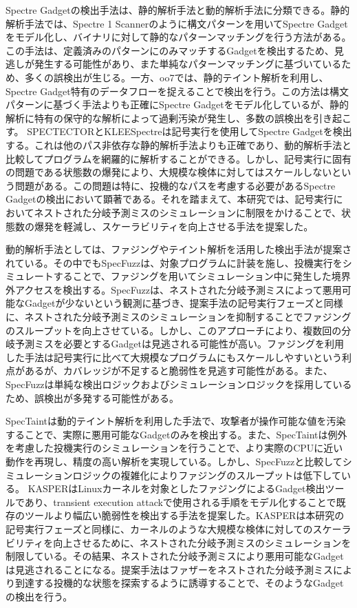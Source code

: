 Spectre Gadgetの検出手法は、静的解析手法と動的解析手法に分類できる。静的解析手法では、Spectre 1 Scanner\cite{Spectre-Scanner}のように構文パターンを用いてSpectre Gadgetをモデル化し、バイナリに対して静的なパターンマッチングを行う方法がある。この手法は、定義済みのパターンにのみマッチするGadgetを検出するため、見逃しが発生する可能性があり、また単純なパターンマッチングに基づいているため、多くの誤検出が生じる。一方、oo7\cite{wang2018oo7}では、静的テイント解析を利用し、Spectre Gadget特有のデータフローを捉えることで検出を行う。この方法は構文パターンに基づく手法よりも正確にSpectre Gadgetをモデル化しているが、静的解析に特有の保守的な解析によって過剰汚染が発生し、多数の誤検出を引き起こす。
SPECTECTOR\cite{guarnieri2020spectector}とKLEESpectre\cite{wang2020kleespectre}は記号実行を使用してSpectre Gadgetを検出する。これは他のパス非依存な静的解析手法よりも正確であり、動的解析手法と比較してプログラムを網羅的に解析することができる。しかし、記号実行に固有の問題である状態数の爆発により、大規模な検体に対してはスケールしないという問題がある。この問題は特に、投機的なパスを考慮する必要があるSpectre Gadgetの検出において顕著である。それを踏まえて、本研究では、記号実行においてネストされた分岐予測ミスのシミュレーションに制限をかけることで、状態数の爆発を軽減し、スケーラビリティを向上させる手法を提案した。\par

動的解析手法としては、ファジングやテイント解析を活用した検出手法が提案されている。その中でもSpecFuzz\cite{oleksenko2020specfuzz}は、対象プログラムに計装を施し、投機実行をシミュレートすることで、ファジングを用いてシミュレーション中に発生した境界外アクセスを検出する。SpecFuzzは、ネストされた分岐予測ミスによって悪用可能なGadgetが少ないという観測に基づき、提案手法の記号実行フェーズと同様に、ネストされた分岐予測ミスのシミュレーションを抑制することでファジングのスループットを向上させている。しかし、このアプローチにより、複数回の分岐予測ミスを必要とするGadgetは見逃される可能性が高い。ファジングを利用した手法は記号実行に比べて大規模なプログラムにもスケールしやすいという利点があるが、カバレッジが不足すると脆弱性を見逃す可能性がある。また、SpecFuzzは単純な検出ロジックおよびシミュレーションロジックを採用しているため、誤検出が多発する可能性がある。

SpecTaint\cite{qi2021spectaint}は動的テイント解析を利用した手法で、攻撃者が操作可能な値を汚染することで、実際に悪用可能なGadgetのみを検出する。また、SpecTaintは例外を考慮した投機実行のシミュレーションを行うことで、より実際のCPUに近い動作を再現し、精度の高い解析を実現している。しかし、SpecFuzzと比較してシミュレーションロジックの複雑化によりファジングのスループットは低下している。
KASPER\cite{johannesmeyer2022kasper}はLinuxカーネルを対象としたファジングによるGadget検出ツールであり、transient execution attackで使用される手順をモデル化することで既存のツールより幅広い脆弱性を検出する手法を提案した。KASPERは本研究の記号実行フェーズと同様に、カーネルのような大規模な検体に対してのスケーラビリティを向上させるために、ネストされた分岐予測ミスのシミュレーションを制限している。その結果、ネストされた分岐予測ミスにより悪用可能なGadgetは見逃されることになる。提案手法はファザーをネストされた分岐予測ミスにより到達する投機的な状態を探索するように誘導することで、そのようなGadgetの検出を行う。\par

